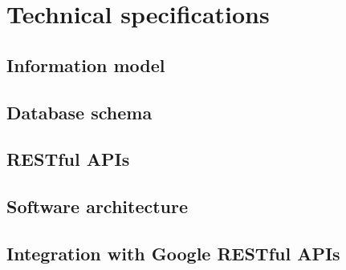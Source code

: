 
\chapter{Technical specifications}

\section{Information model}


\section{Database schema}

\section{RESTful APIs}


\section{Software architecture}

\section{Integration with Google RESTful APIs}
